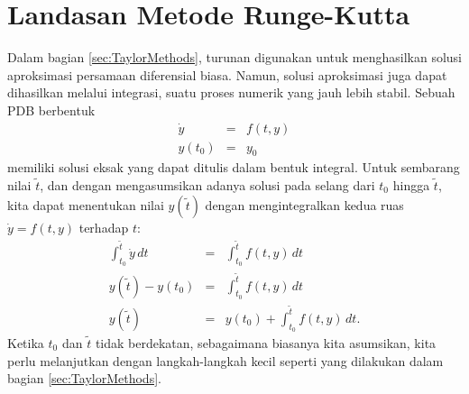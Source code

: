 
\section{Landasan Metode Runge-Kutta\label{sec:Runge-Kutta-Methods}}

Dalam bagian \ref{sec:TaylorMethods}, turunan digunakan untuk menghasilkan
solusi aproksimasi persamaan diferensial biasa. Namun, solusi aproksimasi
juga dapat dihasilkan melalui integrasi, suatu proses numerik yang
jauh lebih stabil. Sebuah PDB berbentuk
\begin{eqnarray*}
\dot{y} & = & f(t,y)\\
y(t_{0}) & = & y_{0}
\end{eqnarray*}
memiliki solusi eksak yang dapat ditulis dalam bentuk integral. Untuk
sembarang nilai $\tilde{t}$, dan dengan mengasumsikan adanya solusi
pada selang dari $t_{0}$ hingga $\tilde{t}$, kita dapat menentukan
nilai $y(\tilde{t})$ dengan mengintegralkan kedua ruas $\dot{y}=f(t,y)$
terhadap $t$: 
\begin{eqnarray}
\int_{t_{0}}^{\tilde{t}}\dot{y}\,dt & = & \int_{t_{0}}^{\tilde{t}}f(t,y)\,dt\nonumber \\
y(\tilde{t})-y(t_{0}) & = & \int_{t_{0}}^{\tilde{t}}f(t,y)\,dt\nonumber \\
y(\tilde{t}) & = & y(t_{0})+\int_{t_{0}}^{\tilde{t}}f(t,y)\,dt.\label{eq:basicRKidea}
\end{eqnarray}
Ketika $t_{0}$ dan $\tilde{t}$ tidak berdekatan, sebagaimana biasanya
kita asumsikan, kita perlu melanjutkan dengan langkah-langkah kecil
seperti yang dilakukan dalam bagian \ref{sec:TaylorMethods}. 

